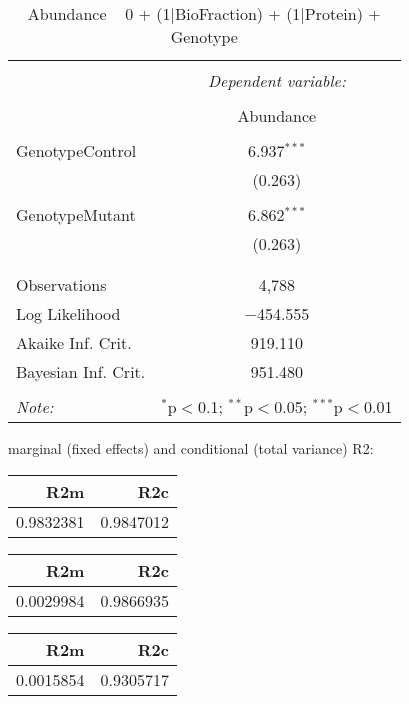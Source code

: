 \documentclass[11pt]{report}
\begin{document}
\begin{table}[!htbp] \centering 
  \caption{Abundance ~ 0 + (1|BioFraction) + (1|Protein) + Genotype} 
  \label{} 
\begin{tabular}{@{\extracolsep{5pt}}lc} 
\\[-1.8ex]\hline 
\hline \\[-1.8ex] 
 & \multicolumn{1}{c}{\textit{Dependent variable:}} \\ 
\cline{2-2} 
\\[-1.8ex] & Abundance \\ 
\hline \\[-1.8ex] 
 GenotypeControl & 6.937$^{***}$ \\ 
  & (0.263) \\ 
  & \\ 
 GenotypeMutant & 6.862$^{***}$ \\ 
  & (0.263) \\ 
  & \\ 
\hline \\[-1.8ex] 
Observations & 4,788 \\ 
Log Likelihood & $-$454.555 \\ 
Akaike Inf. Crit. & 919.110 \\ 
Bayesian Inf. Crit. & 951.480 \\ 
\hline 
\hline \\[-1.8ex] 
\textit{Note:}  & \multicolumn{1}{r}{$^{*}$p$<$0.1; $^{**}$p$<$0.05; $^{***}$p$<$0.01} \\ 
\end{tabular} 
\end{table} 
marginal (fixed effects) and conditional (total variance) R2:

\begin{tabular}{r|r}
\hline
R2m & R2c\\
\hline
0.9832381 & 0.9847012\\
\hline
\end{tabular}

\begin{tabular}{r|r}
\hline
R2m & R2c\\
\hline
0.0029984 & 0.9866935\\
\hline
\end{tabular}

\begin{tabular}{r|r}
\hline
R2m & R2c\\
\hline
0.0015854 & 0.9305717\\
\hline
\end{tabular}
\end{document}
